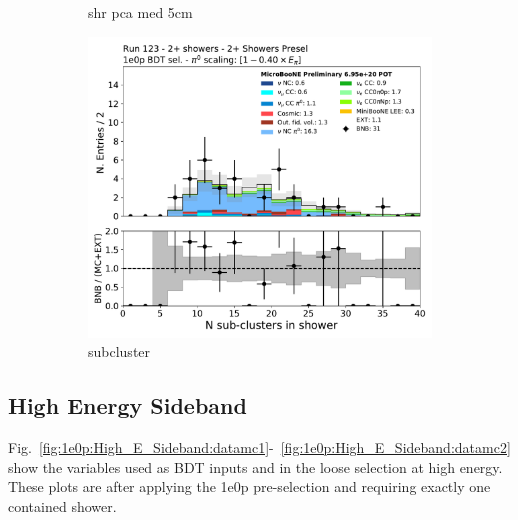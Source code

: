 \begin{figure}[H]
\begin{subfigure}{0.3\textwidth}
    \caption{shr pca med 5cm}
    \end{subfigure}
    \begin{subfigure}{0.3\textwidth}
    \includegraphics[width=1.0\textwidth]{Sidebands/Figures/TwoShr_1e0pSel/BDT/subcluster.pdf}
    \caption{subcluster}
    \end{subfigure}
    \caption{} 
    \label{fig:HE_1eNp_1}
\end{figure}

\subsection{\zpsel High Energy Sideband}
\label{sec:zpHighE_plots}


Fig.~\ref{fig:1e0p:High_E_Sideband:datamc1}-~\ref{fig:1e0p:High_E_Sideband:datamc2} show the variables used as BDT inputs and in the loose selection at high energy. These plots are after applying the 1e0p pre-selection and requiring exactly one contained shower.

